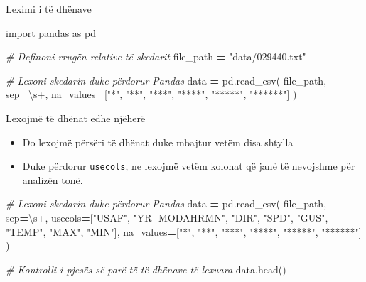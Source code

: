 \documentclass[
  ignorenonframetext,
]{beamer}
\newenvironment{Shaded}{\begin{snugshade}}{\end{snugshade}}
\newcommand{\CommentTok}[1]{\textcolor[rgb]{0.56,0.35,0.01}{\textit{#1}}}
\newcommand{\ImportTok}[1]{#1}
\newcommand{\NormalTok}[1]{#1}
\newcommand{\OperatorTok}[1]{\textcolor[rgb]{0.81,0.36,0.00}{\textbf{#1}}}
\newcommand{\StringTok}[1]{\textcolor[rgb]{0.31,0.60,0.02}{#1}}
\begin{document}
\begin{frame}[fragile]{Leximi i të dhënave}
\protect\hypertarget{leximi-i-tuxeb-dhuxebnave-2}{}
\begin{Shaded}
\begin{Highlighting}[]
\ImportTok{import}\NormalTok{ pandas }\ImportTok{as}\NormalTok{ pd}

\CommentTok{\# Definoni rrugën relative të skedarit}
\NormalTok{file\_path }\OperatorTok{=} \StringTok{"data/029440.txt"}

\CommentTok{\# Lexoni skedarin duke përdorur Pandas}
\NormalTok{data }\OperatorTok{=}\NormalTok{ pd.read\_csv(}
\NormalTok{    file\_path,}
\NormalTok{    sep}\OperatorTok{=}\StringTok{\textquotesingle{}\textbackslash{}s+\textquotesingle{}}\NormalTok{,}
\NormalTok{    na\_values}\OperatorTok{=}\NormalTok{[}\StringTok{"*"}\NormalTok{, }\StringTok{"**"}\NormalTok{, }\StringTok{"***"}\NormalTok{, }\StringTok{"****"}\NormalTok{, }\StringTok{"*****"}\NormalTok{, }\StringTok{"******"}\NormalTok{]}
\NormalTok{)}
\end{Highlighting}
\end{Shaded}
\end{frame}

\begin{frame}[fragile]{Lexojmë të dhënat edhe njëherë}
\protect\hypertarget{lexojmuxeb-tuxeb-dhuxebnat-edhe-njuxebheruxeb}{}
\begin{itemize}
\item
  Do lexojmë përsëri të dhënat duke mbajtur vetëm disa shtylla
\item
  Duke përdorur \texttt{usecols}, ne lexojmë vetëm kolonat që janë të
  nevojshme për analizën tonë.
\end{itemize}

\begin{Shaded}
\begin{Highlighting}[]
\CommentTok{\# Lexoni skedarin duke përdorur Pandas}
\NormalTok{data }\OperatorTok{=}\NormalTok{ pd.read\_csv(}
\NormalTok{    file\_path,}
\NormalTok{    sep}\OperatorTok{=}\StringTok{\textquotesingle{}\textbackslash{}s+\textquotesingle{}}\NormalTok{,}
\NormalTok{    usecols}\OperatorTok{=}\NormalTok{[}\StringTok{"USAF"}\NormalTok{, }\StringTok{"YR{-}{-}MODAHRMN"}\NormalTok{, }\StringTok{"DIR"}\NormalTok{, }\StringTok{"SPD"}\NormalTok{, }\StringTok{"GUS"}\NormalTok{, }\StringTok{"TEMP"}\NormalTok{, }\StringTok{"MAX"}\NormalTok{, }\StringTok{"MIN"}\NormalTok{],}
\NormalTok{    na\_values}\OperatorTok{=}\NormalTok{[}\StringTok{"*"}\NormalTok{, }\StringTok{"**"}\NormalTok{, }\StringTok{"***"}\NormalTok{, }\StringTok{"****"}\NormalTok{, }\StringTok{"*****"}\NormalTok{, }\StringTok{"******"}\NormalTok{]}
\NormalTok{)}

\CommentTok{\# Kontrolli i pjesës së parë të të dhënave të lexuara}
\NormalTok{data.head()}
  
\end{Highlighting}
\end{Shaded}
\end{frame}
\end{document}
